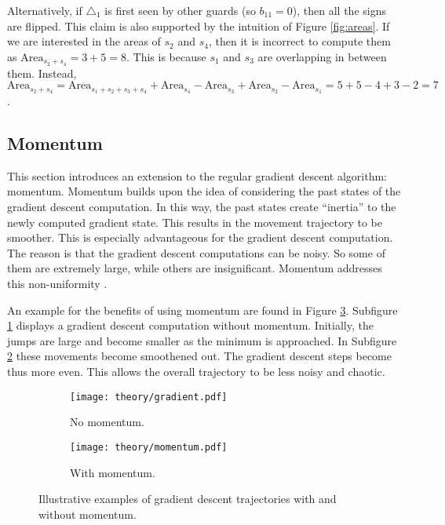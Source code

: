 Alternatively, if $\triangle_1$ is first seen by other guards (so $b_{11} = 0$), then all the signs are flipped. This claim is also supported by the intuition of Figure \ref{fig:areas}. If we are interested in the areas of $s_2$ and $s_4$, then it is incorrect to compute them as $\text{Area}_{s_2 + s_4} = 3 + 5 = 8$. This is because $s_1$ and $s_3$ are overlapping in between them.  Instead, $\text{Area}_{s_2 + s_4} = \text{Area}_{s_1 + s_2 + s_3 + s_4} + \text{Area}_{s_4} - \text{Area}_{s_3} + \text{Area}_{s_2} - \text{Area}_{s_1} = 5 + 5 - 4 + 3 - 2 = 7$.

\subsection{Momentum}
\label{sec:momentum}

This section introduces an extension to the regular gradient descent algorithm: momentum. 
Momentum builds upon the idea of considering the past states of the gradient descent computation. In this way, the past states create ``inertia'' to the newly computed gradient state. This results in the movement trajectory to be smoother. 
This is especially advantageous for the gradient descent computation. The reason is that the gradient descent computations can be noisy. So some of them are extremely large, while others are insignificant. Momentum addresses this non-uniformity \cite{goodfelow2016deep}.

An example for the benefits of using momentum are found in Figure \ref{fig:momentums}. Subfigure \ref{fig:theory_no_momentum} displays a gradient descent computation without momentum. Initially, the jumps are large and become smaller as the minimum is approached. In Subfigure \ref{fig:theory_momentum} these movements become smoothened out. The gradient descent steps become thus more even. This allows the overall trajectory to be less noisy and chaotic.

\begin{figure}[!h]
    \centering
    \begin{subfigure}{0.45\textwidth}
        \texttt{[image: theory/gradient.pdf]}
        \caption{No momentum.}
        \label{fig:theory_no_momentum}
    \end{subfigure}
    \hfill
    \begin{subfigure}{0.45\textwidth}
        \texttt{[image: theory/momentum.pdf]}
        \caption{With momentum.}
        \label{fig:theory_momentum}
    \end{subfigure}
    \caption{Illustrative examples of gradient descent trajectories with and without momentum.}
    \label{fig:momentums}
\end{figure}

